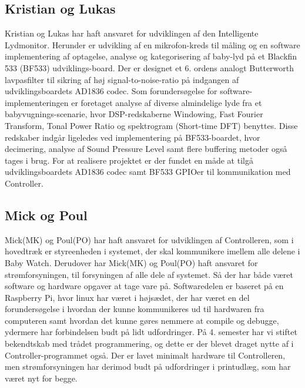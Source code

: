 \subsection*{Kristian og Lukas}
Kristian og Lukas har haft ansvaret for udviklingen af den Intelligente Lydmonitor. Herunder er udvikling af en mikrofon-kreds til måling  og en software implementering af optagelse, analyse og kategorisering af baby-lyd på et Blackfin 533 (BF533) udviklings-board. Der er designet et 6. ordens analogt Butterworth lavpasfilter til sikring af høj signal-to-noise-ratio på indgangen af udviklingsboardets AD1836 codec. Som forundersøgelse for software-implementeringen er foretaget analyse af diverse almindelige lyde fra et babyvugnings-scenarie, hvor DSP-redskaberne Windowing, Fast Fourier Transform, Tonal Power Ratio og spektrogram (Short-time DFT) benyttes. Disse redskaber indgår ligeledes ved implementering på BF533-boardet, hvor decimering, analyse af Sound Pressure Level samt flere buffering metoder også tages i brug. For at realisere projektet er der fundet en måde at tilgå udviklingsboardets AD1836 codec samt BF533 GPIOer til kommunikation med Controller.  \\

\subsection*{Mick og Poul}
Mick(MK) og Poul(PO) har haft ansvaret for udviklingen af Controlleren, som i hovedtræk er styreenheden i systemet, der skal kommunikere imellem alle delene i Baby Watch. Derudover har Mick(MK) og Poul(PO) haft ansvaret for strømforsyningen, til forsyningen af alle dele af systemet. Så der har både været software og hardware opgaver at tage vare på. Softwaredelen er baseret på en Raspberry Pi, hvor linux har været i højsædet, der har været en del forundersøgelse i hvordan der kunne kommunikeres ud til hardwaren fra computeren samt hvordan det kunne gøres nemmere at compile og debugge, ydermere har \iic forbindelsen budt på lidt udfordringer. På 4. semester har vi stiftet bekendtskab med trådet programmering, og dette er der blevet draget nytte af i Controller-programmet også. Der er lavet minimalt hardware til Controlleren, men strømforsyningen har derimod budt på udfordringer i printudlæg, som har været nyt for begge.
